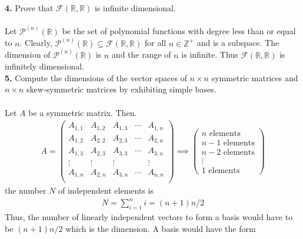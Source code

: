 \documentclass[11pt]{amsart}
\theoremstyle{definition}  %
\newcommand{\Z}{\mathbb{Z}}
\newcommand{\R}{\mathbb{R}}
\begin{document}
\newpage
\vskip 0.1cm
\noindent
{\bf 4.} Prove that $\mathcal{F}(\R, \R)$ is infinite dimensional. \\
\\
Let $\mathcal{P}^{(n)}(\R)$ be the set of polynomial functions with degree less than or equal to $n$.  Clearly, $\mathcal{P}^{(n)}(\R) \subseteq \mathcal{F}(\R, \R)$ for all $n \in \Z^+$ and is a subspace.  The dimension of $\mathcal{P}^{(n)}(\R)$ is $n$ and the range of $n$ is infinite.  Thus $\mathcal{F}(\R,\R)$ is infinitely dimensional.
\\

\vskip 0.1cm
\noindent
{\bf 5.} Compute the dimensions of the vector spaces of $n \times n$ symmetric matrices and $n \times n$ skew-symmetric matrices
by exhibiting simple bases. \\
\\
Let $A$ be a symmetric matrix.  Then.
\begin{align*}
	A =	\left ( \begin{array}{ccccc}
		A_{1,1} & A_{1,2} & A_{1,3} & \cdots & A_{1,n}\\
		A_{1,2} & A_{2,2} & A_{2,3} & \cdots & A_{2,n}\\
		A_{1,3} & A_{2,3} & A_{3,3} & \cdots & A_{3,n}\\ 
		\vdots  & \vdots  & \vdots  &        & \vdots \\
		A_{1,n} & A_{2,n} & A_{3,n} & \cdots & A_{n,n}\\		
	\end{array} \right ) \implies \left ( \begin{array}{c}
		n \text{ elements} \\
		n-1 \text{ elements} \\
		n-2 \text{ elements} \\
		\vdots \\
		1 \text{ elements} 
	\end{array}\right )
\end{align*}the number $N$ of independent elements is 
\begin{align*}
	N = \sum_{i=1}^n i = (n+1)n/2
\end{align*}Thus, the number of linearly independent vectors to form a basis would have to be $(n+1)n/2$ which is the dimension. A basis would have the form 
\end{document}
